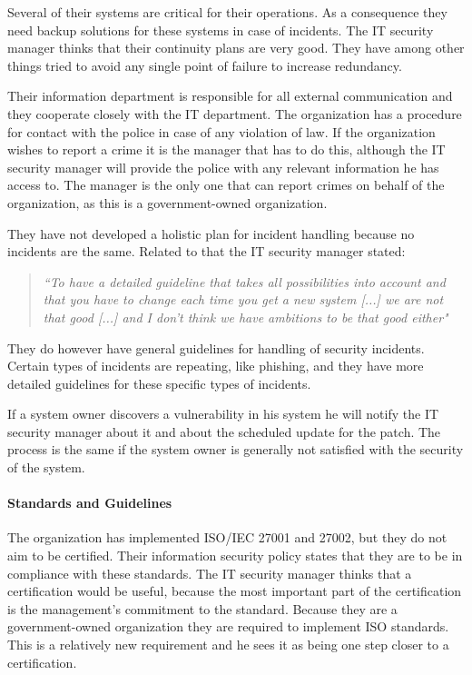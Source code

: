 Several of their systems are critical for their operations. As a consequence they need backup solutions for these systems in case of incidents. The IT security manager thinks that their continuity plans are very good. They have among other things tried to avoid any single point of failure to increase redundancy.

Their information department is responsible for all external communication and they cooperate closely with the IT department. The organization has a procedure for contact with the police in case of any violation of law. If the organization wishes to report a crime it is the manager that has to do this, although the IT security manager will provide the police with any relevant information he has access to. The manager is the only one that can report crimes on behalf of the organization, as this is a government-owned organization.

They have not developed a holistic plan for incident handling because no incidents are the same. Related to that the IT security manager stated:

\begin{quote}
\textit{``To have a detailed guideline that takes all possibilities into account and that you have to change each time you get a new system %
[...] we are not that good [...] and I don't think we have ambitions to be that good either"}
\end{quote}

They do however have general guidelines for handling of security incidents. Certain types of incidents are repeating, like phishing, and they have more detailed guidelines for these specific types of incidents.

If a system owner discovers a vulnerability in his system he will notify the IT security manager about it and about the scheduled update for the patch. The process is the same if the system owner is generally not satisfied with the security of the system.

\paragraph{Standards and Guidelines}
The organization has implemented \acs{ISO}/\acs{IEC} 27001 and 27002, but they do not aim to be certified. Their information security policy states that they are to be in compliance with these standards. The IT security manager thinks that a certification would be useful, because the most important part of the certification is the management's commitment to the standard. Because they are a government-owned organization they are required to implement \acs{ISO} standards. This is a relatively new requirement and he sees it as being one step closer to a certification.

